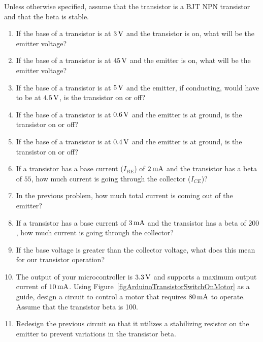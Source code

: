 
Unless otherwise specified, assume that the transistor is a BJT NPN transistor and that the beta is stable.

\begin{enumerate}
\item If the base of a transistor is at $3\,\si{\volt}$ and the transistor is on, what will be the emitter voltage?
\item If the base of a transistor is at $45\,\si{\volt}$ and the emitter is on, what will be the emitter voltage?
\item If the base of a transistor is at $5\,\si{\volt}$ and the emitter, if conducting, would have to be at $4.5\,\si{\volt}$, is the transistor on or off?
\item If the base of a transistor is at $0.6\,\si{\volt}$ and the emitter is at ground, is the transistor on or off?
\item If the base of a transistor is at $0.4\,\si{\volt}$ and the emitter is at ground, is the transistor on or off?
\item If a transistor has a base current ($I_{BE}$) of $2\,\si{\milli\ampere}$ and the transistor has a beta of $55$, how much current is going through the collector ($I_{CE}$)?
\item In the previous problem, how much total current is coming out of the emitter?
\item If a transistor has a base current of $3\,\si{\milli\ampere}$ and the transistor has a beta of $200$, how much current is going through the collector?
\item If the base voltage is greater than the collector voltage, what does this mean for our transistor operation?
\item The output of your microcontroller is $3.3\,\si{\volt}$ and supports a maximum output current of $10\,\si{\milli\ampere}$.  Using Figure~\ref{figArduinoTransistorSwitchOnMotor} as a guide, design a circuit to control a motor that requires $80\,\si{\milli\ampere}$ to operate.  Assume that the transistor beta is 100.
\item Redesign the previous circuit so that it utilizes a stabilizing resistor on the emitter to prevent variations in the transistor beta.
\end{enumerate}
